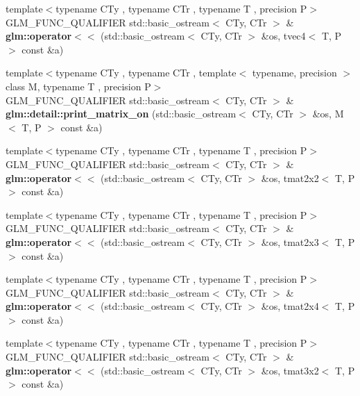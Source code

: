 \begin{DoxyCompactItemize}
\item 
{\footnotesize template$<$typename C\+Ty , typename C\+Tr , typename T , precision P$>$ }\\G\+L\+M\+\_\+\+F\+U\+N\+C\+\_\+\+Q\+U\+A\+L\+I\+F\+I\+ER std\+::basic\+\_\+ostream$<$ C\+Ty, C\+Tr $>$ \& {\bfseries glm\+::operator$<$$<$} (std\+::basic\+\_\+ostream$<$ C\+Ty, C\+Tr $>$ \&os, tvec4$<$ T, P $>$ const \&a)
\item 
\mbox{\label{io_8inl_a705becbf05df4c8637731f85569fc0e6}} 
{\footnotesize template$<$typename C\+Ty , typename C\+Tr , template$<$ typename, precision $>$ class M, typename T , precision P$>$ }\\G\+L\+M\+\_\+\+F\+U\+N\+C\+\_\+\+Q\+U\+A\+L\+I\+F\+I\+ER std\+::basic\+\_\+ostream$<$ C\+Ty, C\+Tr $>$ \& {\bfseries glm\+::detail\+::print\+\_\+matrix\+\_\+on} (std\+::basic\+\_\+ostream$<$ C\+Ty, C\+Tr $>$ \&os, M$<$ T, P $>$ const \&a)
\item 
{\footnotesize template$<$typename C\+Ty , typename C\+Tr , typename T , precision P$>$ }\\G\+L\+M\+\_\+\+F\+U\+N\+C\+\_\+\+Q\+U\+A\+L\+I\+F\+I\+ER std\+::basic\+\_\+ostream$<$ C\+Ty, C\+Tr $>$ \& {\bfseries glm\+::operator$<$$<$} (std\+::basic\+\_\+ostream$<$ C\+Ty, C\+Tr $>$ \&os, tmat2x2$<$ T, P $>$ const \&a)
\item 
{\footnotesize template$<$typename C\+Ty , typename C\+Tr , typename T , precision P$>$ }\\G\+L\+M\+\_\+\+F\+U\+N\+C\+\_\+\+Q\+U\+A\+L\+I\+F\+I\+ER std\+::basic\+\_\+ostream$<$ C\+Ty, C\+Tr $>$ \& {\bfseries glm\+::operator$<$$<$} (std\+::basic\+\_\+ostream$<$ C\+Ty, C\+Tr $>$ \&os, tmat2x3$<$ T, P $>$ const \&a)
\item 
{\footnotesize template$<$typename C\+Ty , typename C\+Tr , typename T , precision P$>$ }\\G\+L\+M\+\_\+\+F\+U\+N\+C\+\_\+\+Q\+U\+A\+L\+I\+F\+I\+ER std\+::basic\+\_\+ostream$<$ C\+Ty, C\+Tr $>$ \& {\bfseries glm\+::operator$<$$<$} (std\+::basic\+\_\+ostream$<$ C\+Ty, C\+Tr $>$ \&os, tmat2x4$<$ T, P $>$ const \&a)
\item 
{\footnotesize template$<$typename C\+Ty , typename C\+Tr , typename T , precision P$>$ }\\G\+L\+M\+\_\+\+F\+U\+N\+C\+\_\+\+Q\+U\+A\+L\+I\+F\+I\+ER std\+::basic\+\_\+ostream$<$ C\+Ty, C\+Tr $>$ \& {\bfseries glm\+::operator$<$$<$} (std\+::basic\+\_\+ostream$<$ C\+Ty, C\+Tr $>$ \&os, tmat3x2$<$ T, P $>$ const \&a)
\item 

\end{DoxyCompactItemize}
